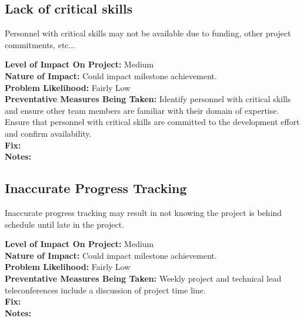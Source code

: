 \documentclass[english]{article}
\newcommand{\sreq}[1]{\subsection{\hspace{.2in}#1}}
\newenvironment
{reqlist}
{\begin{list} {} {} \rm \item[]}
{\end{list}}
\begin{document}
\sreq{Lack of critical skills}
Personnel with critical skills may not be available due to funding, other
project commitments, etc...
\begin{reqlist}
{\bf Level of Impact On Project:} Medium \\
{\bf Nature of Impact:} Could impact milestone achievement.\\
{\bf Problem Likelihood:} Fairly Low \\
{\bf Preventative Measures Being Taken:}
Identify personnel with critical skills and ensure other team
members are familiar with their domain of expertise.
Ensure that personnel with critical skills are committed
to the development effort and confirm availability.
\\
{\bf Fix:}\\
{\bf Notes:} 
\end{reqlist}

\sreq{Inaccurate Progress Tracking}
Inaccurate progress tracking may result in not knowing the project is
behind schedule until late in the project.
\begin{reqlist}
{\bf Level of Impact On Project:} Medium \\
{\bf Nature of Impact:} Could impact milestone achievement.\\
{\bf Problem Likelihood:} Fairly Low \\
{\bf Preventative Measures Being Taken:}
Weekly project and technical lead teleconferences
include a discussion of project time line.
\\
{\bf Fix:}\\
{\bf Notes:} 
\end{reqlist}
\end{document}
